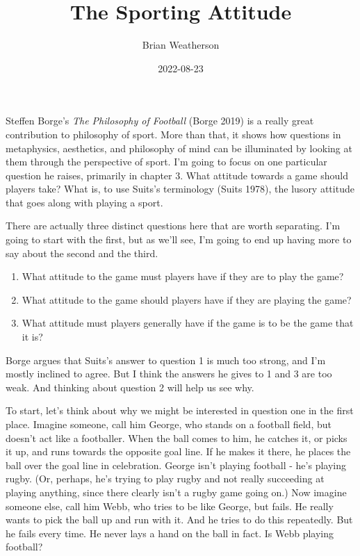 \documentclass[
  12pt,
]{article}
\title{The Sporting Attitude}
\author{Brian Weatherson}
\date{2022-08-23}
\providecommand{\tightlist}{%
  \setlength{\itemsep}{0pt}\setlength{\parskip}{0pt}}
\begin{document}
\maketitle

Steffen Borge's \emph{The Philosophy of Football} (Borge 2019) is a really great contribution to philosophy of sport. More than that, it shows how questions in metaphysics, aesthetics, and philosophy of mind can be illuminated by looking at them through the perspective of sport. I'm going to focus on one particular question he raises, primarily in chapter 3. What attitude towards a game should players take? What is, to use Suits's terminology (Suits 1978), the lusory attitude that goes along with playing a sport.

There are actually three distinct questions here that are worth separating. I'm going to start with the first, but as we'll see, I'm going to end up having more to say about the second and the third.

\begin{enumerate}
\def\labelenumi{\arabic{enumi}.}
\tightlist
\item
  What attitude to the game must players have if they are to play the game?
\item
  What attitude to the game should players have if they are playing the game?
\item
  What attitude must players generally have if the game is to be the game that it is?
\end{enumerate}

Borge argues that Suits's answer to question 1 is much too strong, and I'm mostly inclined to agree. But I think the answers he gives to 1 and 3 are too weak. And thinking about question 2 will help us see why.

To start, let's think about why we might be interested in question one in the first place. Imagine someone, call him George, who stands on a football field, but doesn't act like a footballer. When the ball comes to him, he catches it, or picks it up, and runs towards the opposite goal line. If he makes it there, he places the ball over the goal line in celebration. George isn't playing football - he's playing rugby. (Or, perhaps, he's trying to play rugby and not really succeeding at playing anything, since there clearly isn't a rugby game going on.) Now imagine someone else, call him Webb, who tries to be like George, but fails. He really wants to pick the ball up and run with it. And he tries to do this repeatedly. But he fails every time. He never lays a hand on the ball in fact. Is Webb playing football?
\end{document}
